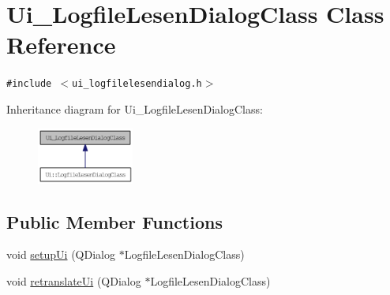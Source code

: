 \hypertarget{class_ui___logfile_lesen_dialog_class}{
\section{Ui\_\-LogfileLesenDialogClass Class Reference}
\label{class_ui___logfile_lesen_dialog_class}
}
{\tt \#include $<$ui\_\-logfilelesendialog.h$>$}

Inheritance diagram for Ui\_\-LogfileLesenDialogClass:\nopagebreak
\begin{figure}[H]
\begin{center}
\leavevmode
\includegraphics[width=90pt]{class_ui___logfile_lesen_dialog_class__inherit__graph}
\end{center}
\end{figure}
\subsection*{Public Member Functions}
\begin{CompactItemize}
\item 
void \hyperlink{class_ui___logfile_lesen_dialog_class_93c3bd2ec951df52fe5d2ebd7ad07dd1}{setupUi} (QDialog $\ast$LogfileLesenDialogClass)
\item 
void \hyperlink{class_ui___logfile_lesen_dialog_class_651e3ce2657266ca01523d7e73dfb1a2}{retranslateUi} (QDialog $\ast$LogfileLesenDialogClass)
\end{CompactItemize}
